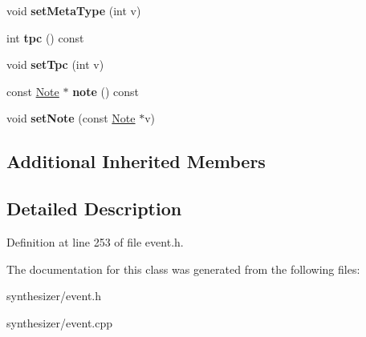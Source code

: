 \begin{DoxyCompactItemize}
\item 
\mbox{\label{class_ms_1_1_event_a42c32e46667698b6cc9a252b8065645c}} 
void {\bfseries set\+Meta\+Type} (int v)
\item 
\mbox{\label{class_ms_1_1_event_a793ea6e8fe793ecbe8d5123c2978830b}} 
int {\bfseries tpc} () const
\item 
\mbox{\label{class_ms_1_1_event_a70ff2d1d661c33d7535e1047819193e5}} 
void {\bfseries set\+Tpc} (int v)
\item 
\mbox{\label{class_ms_1_1_event_aab209fee54d85fada100d76102d2b37c}} 
const \hyperlink{class_ms_1_1_note}{Note} $\ast$ {\bfseries note} () const
\item 
\mbox{\label{class_ms_1_1_event_af3d1c32c0fbacea46d946772bf8d288d}} 
void {\bfseries set\+Note} (const \hyperlink{class_ms_1_1_note}{Note} $\ast$v)
\end{DoxyCompactItemize}
\subsection*{Additional Inherited Members}


\subsection{Detailed Description}


Definition at line 253 of file event.\+h.



The documentation for this class was generated from the following files\+:\begin{DoxyCompactItemize}
\item 
synthesizer/event.\+h\item 
synthesizer/event.\+cpp\end{DoxyCompactItemize}
